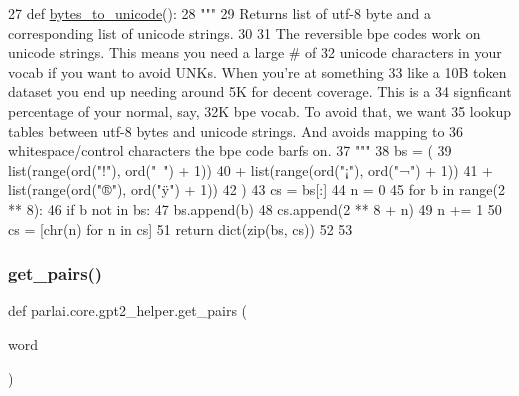 \begin{DoxyCode}
27 \textcolor{keyword}{def }\hyperlink{namespaceparlai_1_1core_1_1gpt2__helper_ae992d8ce81708900b1b1bb81bc7a816d}{bytes\_to\_unicode}():
28     \textcolor{stringliteral}{"""}
29 \textcolor{stringliteral}{    Returns list of utf-8 byte and a corresponding list of unicode strings.}
30 \textcolor{stringliteral}{}
31 \textcolor{stringliteral}{    The reversible bpe codes work on unicode strings. This means you need a large # of}
32 \textcolor{stringliteral}{    unicode characters in your vocab if you want to avoid UNKs. When you're at something}
33 \textcolor{stringliteral}{    like a 10B token dataset you end up needing around 5K for decent coverage. This is a}
34 \textcolor{stringliteral}{    signficant percentage of your normal, say, 32K bpe vocab. To avoid that, we want}
35 \textcolor{stringliteral}{    lookup tables between utf-8 bytes and unicode strings. And avoids mapping to}
36 \textcolor{stringliteral}{    whitespace/control characters the bpe code barfs on.}
37 \textcolor{stringliteral}{    """}
38     bs = (
39         list(range(ord(\textcolor{stringliteral}{"!"}), ord(\textcolor{stringliteral}{"~"}) + 1))
40         + list(range(ord(\textcolor{stringliteral}{"¡"}), ord(\textcolor{stringliteral}{"¬"}) + 1))
41         + list(range(ord(\textcolor{stringliteral}{"®"}), ord(\textcolor{stringliteral}{"ÿ"}) + 1))
42     )
43     cs = bs[:]
44     n = 0
45     \textcolor{keywordflow}{for} b \textcolor{keywordflow}{in} range(2 ** 8):
46         \textcolor{keywordflow}{if} b \textcolor{keywordflow}{not} \textcolor{keywordflow}{in} bs:
47             bs.append(b)
48             cs.append(2 ** 8 + n)
49             n += 1
50     cs = [chr(n) \textcolor{keywordflow}{for} n \textcolor{keywordflow}{in} cs]
51     \textcolor{keywordflow}{return} dict(zip(bs, cs))
52 
53 
\end{DoxyCode}
\mbox{\label{namespaceparlai_1_1core_1_1gpt2__helper_ac5bffa2aece99e43444185ba85dff425}} 
\subsubsection{\texorpdfstring{get\+\_\+pairs()}{get\_pairs()}}
{\footnotesize\ttfamily def parlai.\+core.\+gpt2\+\_\+helper.\+get\+\_\+pairs (\begin{DoxyParamCaption}\item[{}]{word }\end{DoxyParamCaption})}

